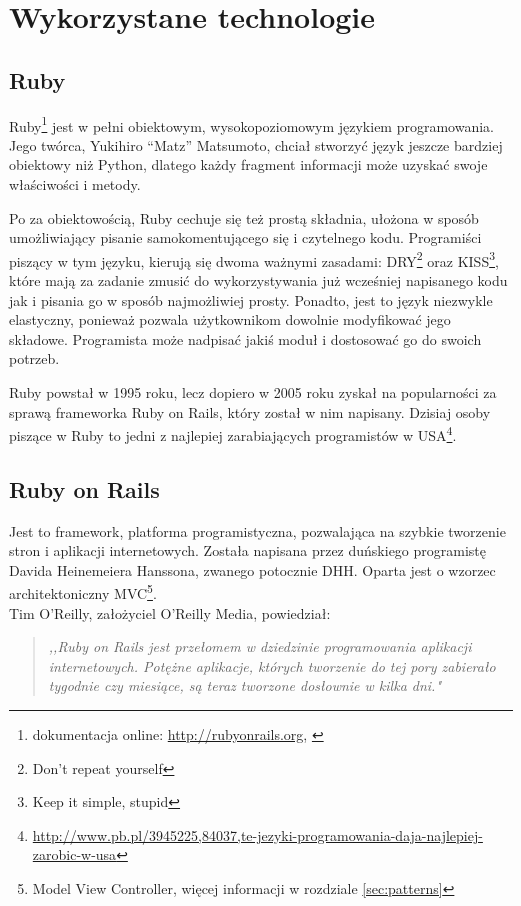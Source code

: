 \section{Wykorzystane technologie}
  \subsection{Ruby}
  Ruby\footnote{dokumentacja online: \url{http://rubyonrails.org}, \cite{ruby_lang}} jest w pełni obiektowym, wysokopoziomowym językiem programowania. Jego twórca, Yukihiro “Matz” Matsumoto, chciał stworzyć język jeszcze bardziej obiektowy niż Python, dlatego każdy fragment informacji może uzyskać swoje właściwości i metody.

  Po za obiektowością, Ruby cechuje się też prostą składnia, ułożona w sposób umożliwiający pisanie samokomentującego się i czytelnego kodu. Programiści piszący w tym języku, kierują się dwoma ważnymi zasadami: DRY\footnote{Don't repeat yourself\cite{programming_ruby}} oraz KISS\footnote{Keep it simple, stupid\cite{programming_ruby}}, które mają za zadanie zmusić do wykorzystywania już wcześniej napisanego kodu jak i pisania go w sposób najmożliwiej prosty. Ponadto, jest to język niezwykle elastyczny, ponieważ pozwala użytkownikom dowolnie modyfikować jego składowe. Programista może nadpisać jakiś moduł i dostosować go do swoich potrzeb.

  Ruby powstał w 1995 roku, lecz dopiero w 2005 roku zyskał na popularności za sprawą frameworka Ruby on Rails, który został w nim napisany. Dzisiaj osoby piszące w Ruby to jedni z najlepiej zarabiających programistów w USA\footnote{\url{http://www.pb.pl/3945225,84037,te-jezyki-programowania-daja-najlepiej-zarobic-w-usa}}.

  \subsection{Ruby on Rails}
  Jest to framework, platforma programistyczna, pozwalająca na szybkie tworzenie stron i aplikacji internetowych. Została napisana przez duńskiego programistę Davida Heinemeiera Hanssona, zwanego potocznie DHH. Oparta jest o wzorzec architektoniczny MVC\footnote{Model View Controller, więcej informacji w rozdziale \ref{sec:patterns}}. \\
  Tim O'Reilly, założyciel O'Reilly Media, powiedział:
  \begin{quote}
    \emph{,,Ruby on Rails jest przełomem w dziedzinie programowania aplikacji internetowych.
    Potężne aplikacje, których tworzenie do tej pory zabierało tygodnie czy miesiące, są teraz tworzone dosłownie w kilka dni."}
  \end{quote}

